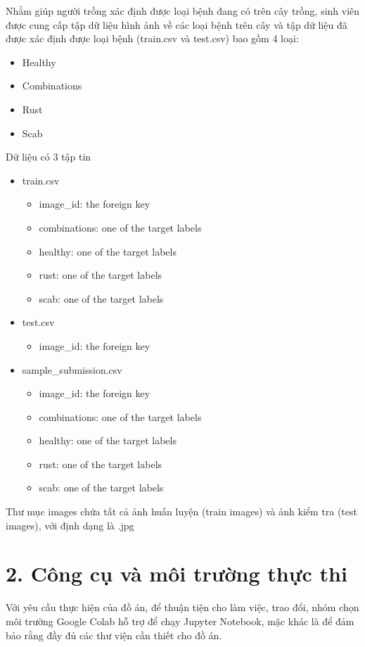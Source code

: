 \documentclass{article}
\begin{document}
	Nhằm giúp người trồng xác định được loại bệnh đang có trên cây trồng,
	sinh viên được cung cấp tập dữ liệu hình ảnh về các loại bệnh trên cây và tập dữ
	liệu đã được xác định được loại bệnh (train.csv và test.csv) bao gồm 4 loại:
	\begin{itemize}
		\item Healthy
		\item Combinations
		\item Rust
		\item Scab
	\end{itemize}
	Dữ liệu có 3 tập tin
	\begin{itemize}
		\item train.csv
		\begin{itemize}
			\item image\_id: the foreign key
			\item combinations: one of the target labels
			\item healthy: one of the target labels
			\item rust: one of the target labels
			\item scab: one of the target labels
		\end{itemize}
		\item test.csv
		\begin{itemize}
			\item image\_id: the foreign key
		\end{itemize}
		\item sample\_submission.csv
		\begin{itemize}
			\item image\_id: the foreign key
			\item combinations: one of the target labels
			\item healthy: one of the target labels
			\item rust: one of the target labels
			\item scab: one of the target labels
		\end{itemize}
	\end{itemize}
	Thư mục images chứa tất cả ảnh huấn luyện (train images) và ảnh kiểm tra (test images), với định dạng là .jpg
	\section{2. Công cụ và môi trường thực thi}
	\qquad Với yêu cầu thực hiện của đồ án, để thuận tiện cho làm việc, trao đổi, nhóm chọn môi trường Google Colab hỗ trợ để chạy Jupyter Notebook, mặc khác là để đảm bảo rằng đầy đủ các thư viện cần thiết cho đồ án.
	
\end{document}
